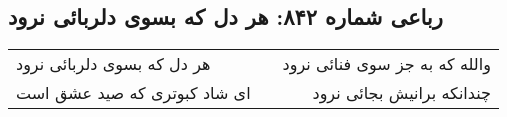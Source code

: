 \begin{center}
\section*{رباعی شماره ۸۴۲: هر دل که بسوی دلربائی نرود}
\label{sec:0842}
\begin{longtable}{l p{0.5cm} r}
هر دل که بسوی دلربائی نرود
&&
والله که به جز سوی فنائی نرود
\\
ای شاد کبوتری که صید عشق است
&&
چندانکه برانیش بجائی نرود
\\
\end{longtable}
\end{center}
